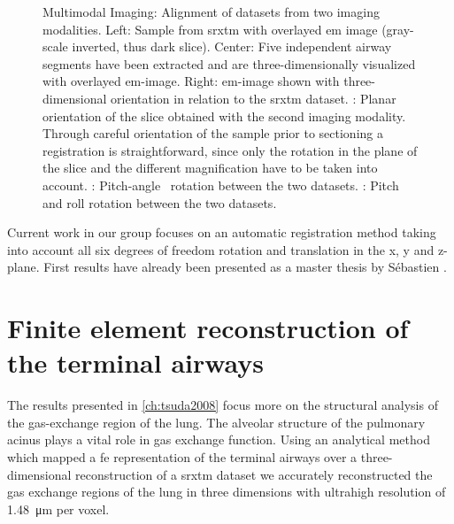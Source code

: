 \begin{figure}[h]
{%
		\label{subfig:correlation-arbitrary3}%
		}%
	\caption[Multimodal Imaging]{Multimodal Imaging: Alignment of datasets from two imaging modalities. Left: Sample from \ac{srxtm} with overlayed \ac{em} image (gray-scale inverted, thus dark slice). Center: Five independent airway segments have been extracted and are three-dimensionally visualized with overlayed \ac{em}-image. Right: \ac{em}-image shown with three-dimensional orientation in relation to the \ac{srxtm} dataset. : Planar orientation of the slice obtained with the second imaging modality. Through careful orientation of the sample prior to sectioning a registration is straightforward, since only the rotation in the plane of the slice and the different magnification have to be taken into account. : Pitch-angle~\cite{YawPitchRoll} rotation between the two datasets. : Pitch and roll rotation between the two datasets.}%
	\label{fig:correlation}%
\end{figure}

Current work in our group focuses on an automatic registration method taking into account all six degrees of freedom \ie rotation and translation in the x, y and z-plane. First results have already been presented as a master thesis by Sébastien \citet{Barre2009}.

\section{Finite element reconstruction of the terminal airways}
The results presented in \autoref{ch:tsuda2008} focus more on the structural analysis of the gas-exchange region of the lung. The alveolar structure of the pulmonary acinus plays a vital role in gas exchange function. Using an analytical method which mapped a \ac{fe} representation of the terminal airways over a three-dimensional reconstruction of a \ac{srxtm} dataset we accurately reconstructed the gas exchange regions of the lung in three dimensions with ultrahigh resolution of \SI{1.48}{\micro\meter} per voxel.

